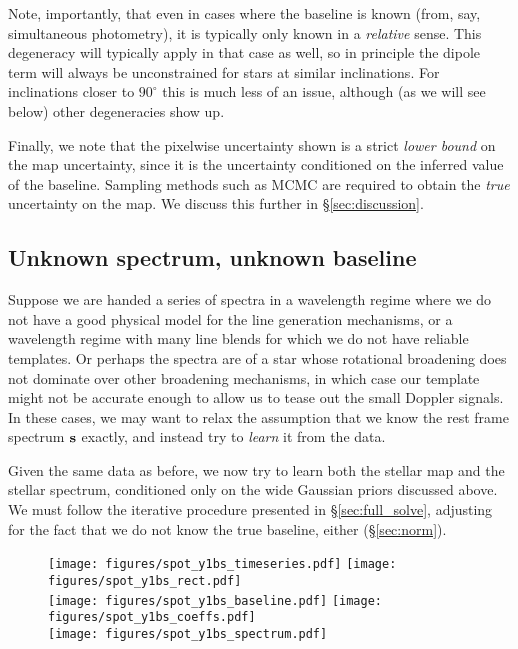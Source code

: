 \documentclass[modern]{aastex62}
\begin{document}
Note, importantly, that even in cases where the baseline is known (from, say,
simultaneous photometry), it is typically only known in a \emph{relative} 
sense. This degeneracy will typically apply in that case as well, so in
principle the dipole term will always be unconstrained for stars at
similar inclinations. For inclinations closer to $90^\circ$ this is much 
less of an issue, although (as we will see below) other degeneracies show up.

Finally, we note that the pixelwise uncertainty shown is a strict
\emph{lower bound} on the map uncertainty, since it is the uncertainty
conditioned on the inferred value of the baseline. Sampling methods
such as MCMC are required to obtain the \emph{true} uncertainty on the 
map. We discuss this further in \S\ref{sec:discussion}.

\subsection{Unknown spectrum, unknown baseline}
\label{sec:spot_y1bs}
%
Suppose we are handed a series of spectra in a wavelength regime where
we do not have a good physical model for the line generation mechanisms,
or a wavelength regime with many line blends for which we do not have
reliable templates. Or perhaps the spectra are of a star whose
rotational broadening does not dominate over other broadening mechanisms,
in which case our template might not be accurate enough to allow us to
tease out the small Doppler signals. In these cases, we may want to relax
the assumption that we know the rest frame spectrum ${\mathbf{s}}$ exactly,
and instead try to \emph{learn} it from the data.

Given the same data as before, we now try to learn both the stellar map
and the stellar spectrum, conditioned only on the wide Gaussian priors
discussed above. We must follow the iterative procedure presented in
\S\ref{sec:full_solve}, adjusting for the fact that we do not know
the true baseline, either (\S\ref{sec:norm}).

\begin{figure}[p!]
    \begin{centering}
    \texttt{[image: figures/spot\_y1bs\_timeseries.pdf]}
    \texttt{[image: figures/spot\_y1bs\_rect.pdf]}
    \\[0.5em]
    \texttt{[image: figures/spot\_y1bs\_baseline.pdf]}
    \texttt{[image: figures/spot\_y1bs\_coeffs.pdf]}
    \\[0.5em]
    \texttt{[image: figures/spot\_y1bs\_spectrum.pdf]}
    \end{centering}
\end{figure}
\end{document}
